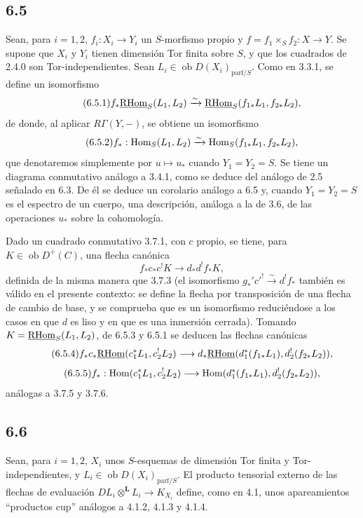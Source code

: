 \subsection*{6.5}
Sean, para $i=1,2$, $f_i:X_i\to Y_i$ un $S$-morfismo propio y $f=f_1\times_Sf_2:X\to Y$. Se supone que $X_i$ y $Y_i$ tienen dimensión Tor finita sobre $S$, y que los cuadrados de 2.4.0 son Tor-independientes. Sean $L_i\in\operatorname{ob}D(X_i)_{\mathrm{parf}/S}$. Como en 3.3.1, se define un isomorfismo
\begin{equation}
\tag{6.5.1}
f_*\underline{\mathrm{RHom}}_S(L_1,L_2)\xrightarrow{\sim}\underline{\mathrm{RHom}}_S(f_{1*}L_1,f_{2*}L_2),
\end{equation}
de donde, al aplicar $R\Gamma(Y,-)$, se obtiene un isomorfismo
\begin{equation}
\tag{6.5.2}
f_*:\operatorname{Hom}_S(L_1,L_2)\xrightarrow{\sim}\operatorname{Hom}_S(f_{1*}L_1,f_{2*}L_2),
\end{equation}
que denotaremos simplemente por $u\mapsto u_*$ cuando $Y_1=Y_2=S$. Se tiene un diagrama conmutativo análogo a 3.4.1, como se deduce del análogo de 2.5 señalado en 6.3. De él se deduce un corolario análogo a 6.5 y, cuando $Y_1=Y_2=S$ es el espectro de un cuerpo, una descripción, análoga a la de 3.6, de las operaciones $u_*$ sobre la cohomología.

Dado un cuadrado conmutativo 3.7.1, con $c$ propio, se tiene, para $K\in\operatorname{ob}D^+(C)$, una flecha canónica
\begin{equation}
\tag{6.5.3}
f_*c_*c^!K\longrightarrow d_*d^!f_*K,
\end{equation}
definida de la misma manera que 3.7.3 (el isomorfismo $g_*'c'^!\xrightarrow{\sim}d^!f_*$ también es válido en el presente contexto: se define la flecha por transposición de una flecha de cambio de base, y se comprueba que es un isomorfismo reduciéndose a los casos en que $d$ es liso y en que es una inmersión cerrada). Tomando $K=\underline{\mathrm{RHom}}_S(L_1,L_2)$, de 6.5.3 y 6.5.1 se deducen las flechas canónicas
\begin{equation}
\tag{6.5.4}
f_*c_*\underline{\mathrm{RHom}}(c_1^*L_1,c_2^!L_2)\longrightarrow d_*\underline{\mathrm{RHom}}(d_1^*(f_{1*}L_1),d_2^!(f_{2*}L_2)),
\end{equation}
\begin{equation}
\tag{6.5.5}
f_*:\operatorname{Hom}(c_1^*L_1,c_2^!L_2)\longrightarrow\operatorname{Hom}(d_1^*(f_{1*}L_1),d_2^!(f_{2*}L_2)),
\end{equation}
análogas a 3.7.5 y 3.7.6.

\subsection*{6.6}
Sean, para $i=1,2$, $X_i$ unos $S$-esquemas de dimensión Tor finita y Tor-independientes, y $L_i\in\operatorname{ob}D(X_i)_{\mathrm{parf}/S}$. El producto tensorial externo de las flechas de evaluación $DL_i\otimes^{\mathbf L}L_i\to K_{X_i}$ define, como en 4.1, unos apareamientos ``productos cup'' análogos a 4.1.2, 4.1.3 y 4.1.4.

